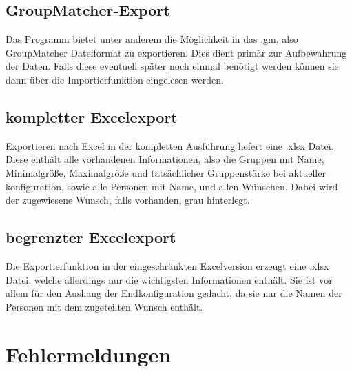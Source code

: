 \documentclass[a4paper,11pt]{article}
\begin{document}
\subsection{GroupMatcher-Export}
\label{ssec:exportgm}

Das Programm bietet unter anderem die Möglichkeit in das .gm, also GroupMatcher Dateiformat zu exportieren. Dies dient primär zur Aufbewahrung der Daten. Falls diese eventuell später noch einmal benötigt werden können sie dann über die Importierfunktion eingelesen werden.

\subsection{kompletter Excelexport}
\label{ssec:exportexf}

Exportieren nach Excel in der kompletten Ausführung liefert eine .xlsx Datei. Diese enthält alle vorhandenen Informationen, also die Gruppen mit Name, Minimalgröße, Maximalgröße und tatsächlicher Gruppenstärke bei aktueller konfiguration, sowie alle Personen mit Name, und allen Wünschen. Dabei wird der zugewiesene Wunsch, falls vorhanden, grau hinterlegt.

\subsection{begrenzter Excelexport}
\label{ssec:exportexl}

Die Exportierfunktion in der eingeschränkten Excelversion erzeugt eine .xlsx Datei, welche allerdings nur die wichtigsten Informationen enthält. Sie ist vor allem für den Aushang der Endkonfiguration gedacht, da sie nur die Namen der Personen mit dem zugeteilten Wunsch enthält.


\section{Fehlermeldungen}
\label{sec:errors}
\end{document}

